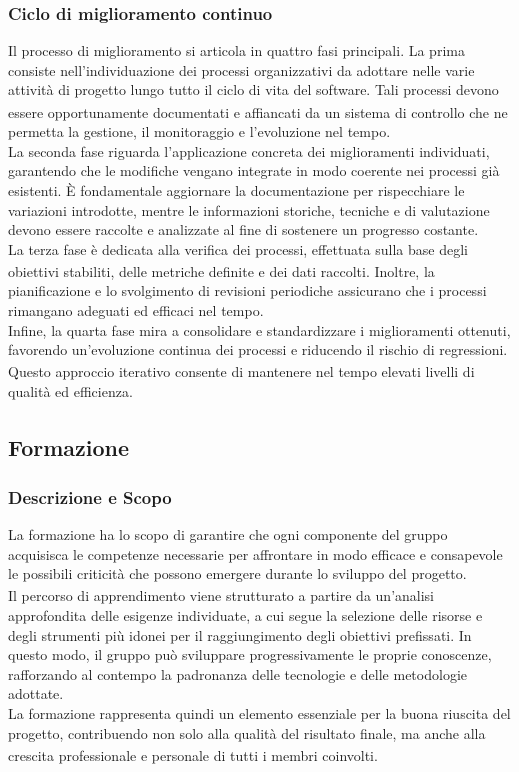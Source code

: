 \documentclass[a4paper,11pt]{article}
\newcommand{\G}{\textsubscript{\scalebox{0.6}{\textbf{G}}}}
\begin{document}
\subsubsection{Ciclo di miglioramento continuo}
Il processo di miglioramento si articola in quattro fasi principali. 
La prima consiste nell'individuazione dei processi organizzativi da adottare nelle varie attività di progetto\G{} lungo tutto il 
ciclo di vita del software. Tali processi devono essere opportunamente documentati e affiancati da un sistema di controllo che 
ne permetta la gestione, il monitoraggio e l'evoluzione nel tempo. \\
La seconda fase riguarda l'applicazione concreta dei miglioramenti individuati, garantendo che le modifiche vengano integrate in 
modo coerente nei processi già esistenti. È fondamentale aggiornare la documentazione per rispecchiare le variazioni introdotte, 
mentre le informazioni storiche, tecniche e di valutazione devono essere raccolte e analizzate al fine di sostenere un progresso 
costante. \\
La terza fase è dedicata alla verifica\G{} dei processi, effettuata sulla base degli obiettivi stabiliti, delle metriche definite e
dei dati raccolti. Inoltre, la pianificazione e lo svolgimento di revisioni periodiche assicurano che i processi rimangano adeguati 
ed efficaci nel tempo. \\
Infine, la quarta fase mira a consolidare e standardizzare i miglioramenti ottenuti, 
favorendo un'evoluzione continua dei processi e riducendo il rischio\G{} di regressioni. 
Questo approccio iterativo consente di mantenere nel tempo elevati livelli di qualità\G{} ed efficienza\G{}.\\



\subsection{Formazione}
\subsubsection{Descrizione e Scopo}
La formazione ha lo scopo di garantire che ogni componente del gruppo acquisisca le competenze necessarie per 
affrontare in modo efficace e consapevole le possibili criticità che possono emergere durante lo sviluppo del progetto\G{}.\\
Il percorso di apprendimento viene strutturato a partire da un'analisi approfondita delle esigenze individuate, a cui segue la 
selezione delle risorse e degli strumenti più idonei per il raggiungimento degli obiettivi prefissati. In questo modo, il gruppo 
può sviluppare progressivamente le proprie conoscenze, rafforzando al contempo la padronanza delle tecnologie e delle metodologie 
adottate.\\
La formazione rappresenta quindi un elemento essenziale per la buona riuscita del progetto\G{}, contribuendo non solo alla qualità\G{} del 
risultato finale, ma anche alla crescita professionale e personale di tutti i membri coinvolti.\\
\end{document}
